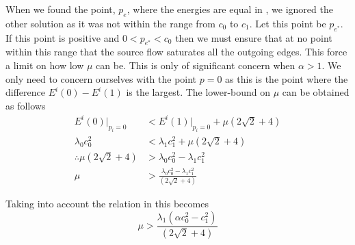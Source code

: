 \begin{definition}
	When we found the point, $p_e$, where the energies are equal in , we ignored the other solution as it was not within the range from $c_0$ to $c_1$. Let this point be $p_{e^*}$. If this point is positive and $0<p_{e^*}<c_0$ then we must ensure that at no point within this range that the source flow saturates all the outgoing edges. This force a limit on how low $\mu$ can be. This is only of significant concern when $\alpha>1$. We only need to concern ourselves with the point $p=0$ as this is the point where the difference $E^i(0)-E^i(1)$ is the largest. The lower-bound on $\mu$ can be obtained as follows
	\begin{equation*}\begin{split}
		E^i(0)|_{p_i=0} &< E^i(1)|_{p_i=0} + \mu \left( 2\sqrt{2} + 4\right) \\
		\lambda_0c_0^2 &< \lambda_1c_1^2 + \mu \left( 2\sqrt{2} + 4\right) \\
		\therefore \mu \left( 2\sqrt{2} + 4\right) &> \lambda_0c_0^2 - \lambda_1c_1^2\\
		\mu &> \frac{\lambda_0c_0^2 - \lambda_1c_1^2}{\left( 2\sqrt{2} + 4\right)}
	\end{split}\end{equation*} 
\end{definition}
Taking into account the relation in  this becomes
\begin{equation}
	\mu > \frac{\lambda_1(\alpha c_0^2-c_1^2)}{\left( 2\sqrt{2} + 4\right)}
	\label{eq:mulowerbound}
\end{equation}

